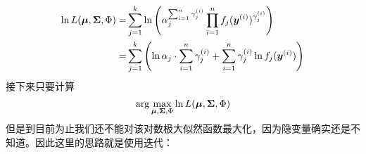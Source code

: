 \documentclass[a4paper,UTF8]{article}
\begin{document}
\begin{equation}
    \begin{split}
        \ln L(\boldsymbol{\mu},\boldsymbol{\Sigma},\Phi)
        =&\sum_{j=1}^k\ln\left(
            \alpha_j^{\sum_{i=1}^n\gamma_j^{(i)}}\prod_{i=1}^nf_j(\boldsymbol{y}^{(i)})^{\gamma^{(i)}_j}
        \right)\\
        =&\sum_{j=1}^k\left( 
            \ln\alpha_j\cdot\sum_{i=1}^n\gamma_j^{(i)}+\sum_{i=1}^n\gamma_j^{(i)}\ln f_j(\boldsymbol{y}^{(i)})
        \right)\\
    \end{split}
\end{equation}接下来只要计算\begin{equation*}
    \arg\max_{\boldsymbol{\mu},\boldsymbol{\Sigma},\Phi}\ln L(\boldsymbol{\mu},\boldsymbol{\Sigma},\Phi)
\end{equation*}但是到目前为止我们还不能对该对数极大似然函数最大化，因为隐变量\myvec{\gamma}确实还是不知道。因此这里的思路就是使用迭代：
\\[0.5em]
\\[0.5em]
\end{document}

